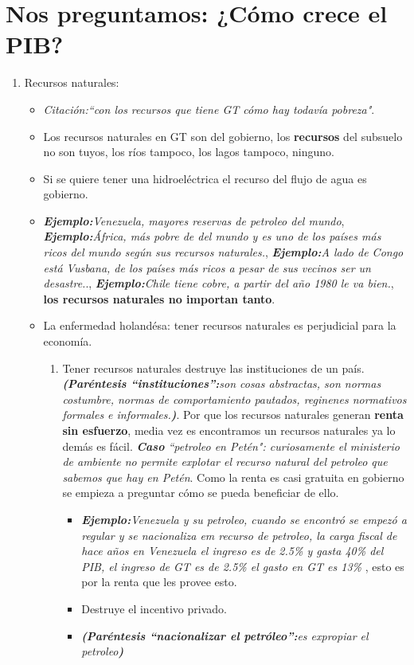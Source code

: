 \section{\textbf{Nos preguntamos:} ¿Cómo crece el PIB?}
\begin{enumerate}
    \item Recursos naturales: 
    \begin{itemize}
        \item \emph{Citación:``con los recursos que tiene GT cómo hay todavía pobreza"}.
        \item Los recursos naturales en GT son del gobierno, los \textbf{recursos} del subsuelo no son tuyos, los ríos tampoco, los lagos tampoco, ninguno.
        \item Si se quiere tener una hidroeléctrica el recurso del flujo de agua es gobierno.
        \item \emph{\textbf{Ejemplo:}Venezuela, mayores reservas de petroleo del mundo}, \emph{\textbf{Ejemplo:}África, más pobre de del mundo y es uno de los países más ricos del mundo según sus recursos naturales.}, \emph{\textbf{Ejemplo:}A lado de Congo está Vusbana, de los países más ricos a pesar de sus vecinos ser un desastre.}., \emph{\textbf{Ejemplo:}Chile tiene cobre, a partir del año 1980 le va bien.}, \textbf{los recursos naturales no importan tanto}.
        \item La enfermedad holandésa: tener recursos naturales es perjudicial para la economía.
        \begin{enumerate}
            \item Tener recursos naturales destruye las instituciones de un país. \emph{\textbf{(Paréntesis ``instituciones'':}son cosas abstractas, son normas costumbre, normas de comportamiento pautados, reginenes normativos formales e informales.\textbf{)}}. Por que los recursos naturales generan \textbf{renta sin esfuerzo}, media vez es encontramos un recursos naturales ya lo demás es fácil. \emph{\textbf{Caso} ``petroleo en Petén": curiosamente el ministerio de ambiente no permite explotar el recurso natural del petroleo que sabemos que hay en Petén}. Como la renta es casi gratuita en gobierno se empieza a preguntar cómo se pueda beneficiar de ello. 
            \begin{itemize}
                \item \emph{\textbf{Ejemplo:}Venezuela y su petroleo, cuando se encontró se empezó a regular y se nacionaliza em recurso de petroleo, la carga fiscal de hace años en Venezuela el ingreso es de 2.5\% y gasta 40\% del PIB, el ingreso de GT es de 2.5\% el gasto en GT es 13\% }, esto es por la renta que les provee esto.
                \item Destruye el incentivo privado.
                \item \emph{\textbf{(Paréntesis ``nacionalizar el petróleo'':}es expropiar el petroleo\textbf{)}}
            \end{itemize}
            

\end{enumerate}
\end{itemize}
\end{enumerate}
